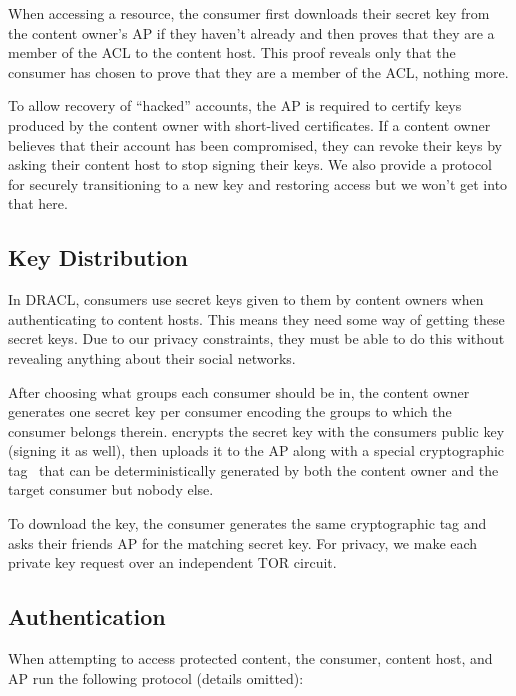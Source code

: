 \documentclass[pdftex,12pt,a4papaer]{report}
\begin{document}
When accessing a resource, the consumer first downloads their secret key from
the content owner's AP if they haven't already and then proves that they are a
member of the ACL to the content host. This proof reveals only that the consumer
has chosen to prove that they are a member of the ACL, nothing more.
  
To allow recovery of ``hacked'' accounts, the AP is required to certify keys
produced by the content owner with short-lived certificates. If a content owner
believes that their account has been compromised, they can revoke their keys by
asking their content host to stop signing their keys. We also provide a protocol
for securely transitioning to a new key and restoring access but we won't get
into that here.

\subsection{Key Distribution}

In DRACL, consumers use secret keys given to them by content owners when
authenticating to content hosts. This means they need some way of getting these
secret keys. Due to our privacy constraints, they must be able to do this
without revealing anything about their social networks.

After choosing what groups each consumer should be in, the content owner
generates one secret key per consumer encoding the groups to which the consumer
belongs therein. encrypts the secret key with the consumers public key (signing
it as well), then uploads it to the AP along with a special cryptographic
tag~ that
can be deterministically generated by both the content owner and the target
consumer but nobody else.

To download the key, the consumer generates the same cryptographic tag and asks
their friends AP for the matching secret key. For privacy, we make each private
key request over an independent TOR circuit.

\subsection{Authentication}

When attempting to access protected content, the consumer, content host, and AP
run the following protocol (details omitted):
\end{document}
